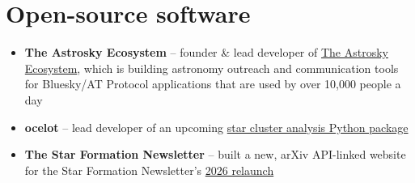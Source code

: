 \section*{Open-source software \href{\cvGitHubLink}{\faGithub}}

\begin{itemize}
    \item \textbf{The Astrosky Ecosystem} -- founder \& lead developer of \href{https://github.com/the-astrosky-ecosystem/}{The Astrosky Ecosystem}, which is building astronomy outreach and communication tools for Bluesky/AT Protocol applications that are used by over 10,000 people a day
    \item \textbf{ocelot} -- lead developer of an upcoming \href{https://github.com/emilyhunt/ocelot}{star cluster analysis Python package}
    \item \textbf{The Star Formation Newsletter} -- built a new, arXiv API-linked website for the Star Formation Newsletter's \href{https://starformationnews.org/}{2026 relaunch}
\end{itemize}